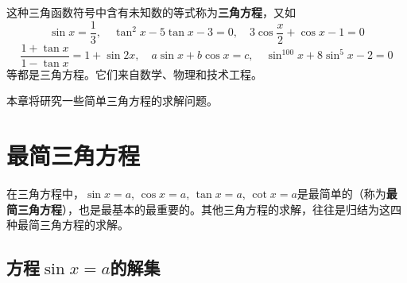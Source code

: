 这种三角函数符号中含有未知数的等式称为\textbf{三角方程}，又如
\[\sin x=\frac{1}{3},\quad \tan^2 x-5\tan x-3=0,\quad 3\cos\frac{x}{2}+\cos x-1=0\]
\[\frac{1+\tan x}{1-\tan x}=1+\sin2x,\quad a\sin x+b\cos x=c,\quad \sin^{100}x+8\sin^5x-2=0\]
等都是三角方程。它们来自数学、物理和技术工程。

本章将研究一些简单三角方程的求解问题。

\section{最简三角方程}
在三角方程中，$\sin x=a$, $\cos x=a$, $\tan x=a$, $\cot x=a$是最简单的（称为\textbf{最简三角方程}），也是最基本的最重要的。其他三角方程的求解，往往是归结为这四种最简三角方程的求解。


\subsection{方程$\sin x=a$的解集}

